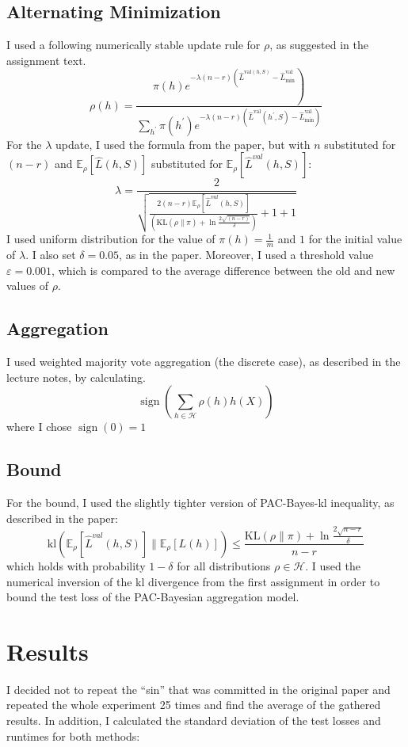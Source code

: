 \documentclass[a4paper]{article}
\begin{document}
\subsection{Alternating Minimization}
I used a following numerically stable
update rule for $\rho$, as suggested in the assignment text.
\[
\rho(h) = 
\frac{\left.\pi(h) e^{-\lambda(n-r)\left(\hat{L}^{\mathrm{val}(h, S)}-\hat{L}_{\mathrm{min}}^{\mathrm{val}}\right.}\right)}{\sum_{h^{\prime}} \pi\left(h^{\prime}\right) e^{-\lambda(n-r)\left(\hat{L}^{\mathrm{val}}\left(h^{\prime}, S\right)-\hat{L}_{\mathrm{min}}^{\mathrm{val}}\right)}}
\]
For the $\lambda$ update, I used the formula from the paper, but with $n$
substituted for $(n-r)$ and $\mathbb{E}_{\rho}[\hat{L}(h,S)]$ substituted for 
$\mathbb{E}_{\rho}[\hat{L}^{val}(h,S)]$:
\[
\lambda=\frac{2}{\sqrt{\frac{2(n-r) \mathbb{E}_{\rho}[\hat{L}^{val}(h,S)]}
    {\left(\mathrm{KL}(\rho \| \pi)+\ln \frac{2
        \sqrt{(n-r)}}{\delta}\right)}+1+1}}
\]
I used uniform distribution for the value of $\pi(h)=\frac{1}{m}$ and $1$ for
the initial value of $\lambda$. I also set $\delta = 0.05$, as in the paper.
Moreover, I used a threshold value $\varepsilon = 0.001$, which is compared to
the average difference between the old and new values of $\rho$.

\subsection{Aggregation}
I used weighted majority vote aggregation (the discrete case), as described
in the lecture notes, by calculating.
\[
\operatorname{sign}\left(\sum_{h \in \mathcal{H}} \rho(h) h(X)\right)
\]
where I chose $\operatorname{sign}(0)=1$

\subsection{Bound}
For the bound, I used the slightly tighter version of PAC-Bayes-kl inequality,
as described in the paper:
\[
\mathrm{kl}\left(\mathbb{E}_{\rho}[\hat{L}^{val}(h, S)] \|
\mathbb{E}_{\rho}[L(h)]\right) \leq \frac{\mathrm{KL}(\rho \| \pi)+\ln \frac{2
    \sqrt{n-r}}{\delta}}{n-r}
\]
which holds with probability $1 - \delta$ for all distributions $\rho \in
\mathcal{H}$. I used the numerical inversion of the kl divergence from the first
assignment in order to bound the test loss of the PAC-Bayesian aggregation model.

\section{Results}
I decided not to repeat the ``sin'' that was committed in the original paper and
repeated the whole experiment 25 times and find the average of the gathered
results. In addition, I calculated the standard deviation of the test losses and
runtimes for both methods:
\end{document}

